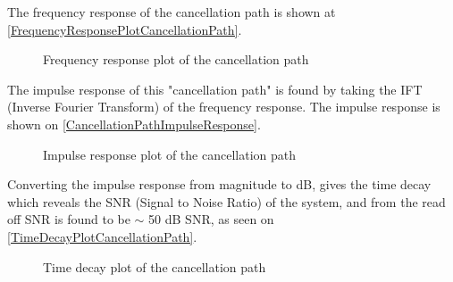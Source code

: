 The frequency response of the cancellation path is shown at \autoref{FrequencyResponsePlotCancellationPath}.

\begin{figure}[H]
	\centering
	
	\caption{Frequency response plot of the cancellation path}
	\label{FrequencyResponsePlotCancellationPath}
\end{figure}



The impulse response of this "cancellation path" is found by taking the IFT (Inverse Fourier Transform) of the frequency response.
The impulse response is shown on \autoref{CancellationPathImpulseResponse}.

\begin{figure}[H]
	\centering
	
	\caption{Impulse response plot of the cancellation path}
	\label{CancellationPathImpulseResponse}
\end{figure}



Converting the impulse response from magnitude to dB, gives the time decay which reveals the SNR (Signal to Noise Ratio) of the system, and from the read off SNR is found to be $\sim$ 50 dB SNR, as seen on \autoref{TimeDecayPlotCancellationPath}.


\begin{figure}[H]
	\centering
	
	\caption{Time decay plot of the cancellation path}
	\label{TimeDecayPlotCancellationPath}
\end{figure}


